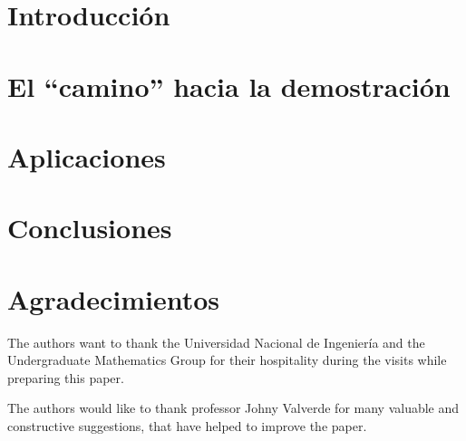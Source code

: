\documentclass[3p,times,a4paper,twocolumn,authoryear]{elsarticle} %
\begin{document}
\tableofcontents

\section{Introducción}

\section{El ``camino'' hacia la demostración}

\section{Aplicaciones}

\section{Conclusiones}

\section*{Agradecimientos}

The authors want to thank the Universidad Nacional de Ingeniería and the Undergraduate Mathematics Group for their hospitality during the visits while preparing this paper.

The authors would like to thank professor Johny Valverde for many valuable and constructive suggestions, that have helped to improve the paper.

\nocite{*}
\printbibliography[title={Referencias}]
\end{document}

